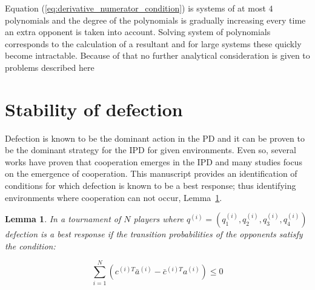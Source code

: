\documentclass[10pt]{article}
\newtheorem{lemma}[theorem]{Lemma}
\begin{document}
Equation (\ref{eq:derivative_numerator_condition}) is systems of at most \(4\)
polynomials and the degree of the polynomials is gradually increasing every time
an extra opponent is taken into account.
Solving system of polynomials corresponds to the calculation of a resultant and
for large systems these quickly become intractable.
Because of that no further analytical consideration is given to problems
described here

\section{Stability of defection}

Defection is known to be the dominant action in the PD and it can be proven to
be the dominant strategy for the IPD for given environments. Even so, several
works have proven that cooperation emerges in the IPD and many studies focus on
the emergence of cooperation. This manuscript provides an identification of
conditions for which defection is known to be a best response; thus identifying
environments where cooperation can not occur, Lemma~\ref{lemma:stability_of_defection}.

\begin{lemma}\label{lemma:stability_of_defection}
    In a tournament of \(N\) players where \(q^{(i)} = (q_{1}^{(i)}, q_{2}^{(i)}, q_{3}^{(i)}, q_{4}^{(i)})\)
    defection is a best response if the transition probabilities of the
    opponents satisfy the condition:

    \begin{equation}
        \sum_{i=1} ^ N (c^{(i)T} \bar{a}^{(i)} - \bar{c}^{(i)T} a^{(i)}) \leq 0
    \end{equation}
\end{lemma}
\end{document}
